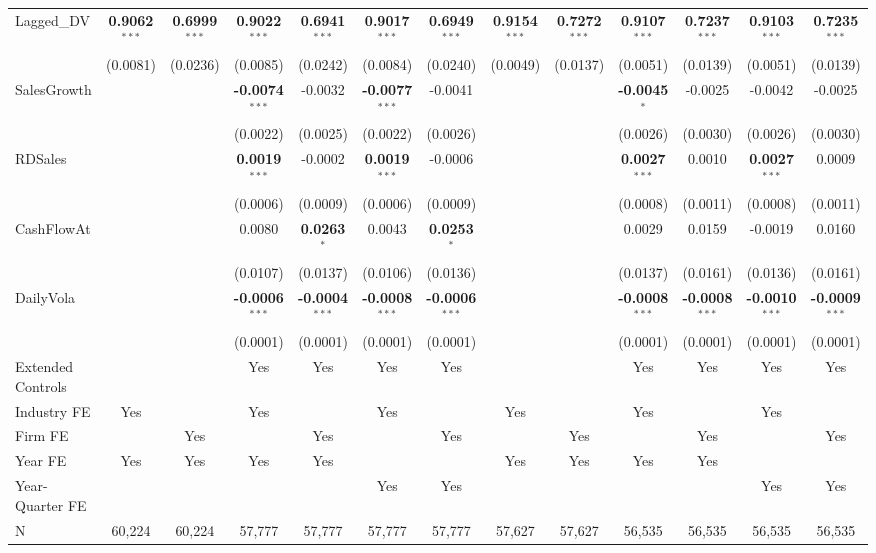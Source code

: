 \begin{landscape}
\begin{table}[H]
\begin{tabular}{lcccccccccccc}
Lagged\_DV & \textbf{0.9062}$^{***}$ & \textbf{0.6999}$^{***}$ & \textbf{0.9022}$^{***}$ & \textbf{0.6941}$^{***}$ & \textbf{0.9017}$^{***}$ & \textbf{0.6949}$^{***}$ & \textbf{0.9154}$^{***}$ & \textbf{0.7272}$^{***}$ & \textbf{0.9107}$^{***}$ & \textbf{0.7237}$^{***}$ & \textbf{0.9103}$^{***}$ & \textbf{0.7235}$^{***}$ \\
 & (0.0081) & (0.0236) & (0.0085) & (0.0242) & (0.0084) & (0.0240) & (0.0049) & (0.0137) & (0.0051) & (0.0139) & (0.0051) & (0.0139) \\
SalesGrowth &  &  & \textbf{-0.0074}$^{***}$ & -0.0032 & \textbf{-0.0077}$^{***}$ & -0.0041 &  &  & \textbf{-0.0045}$^{*}$ & -0.0025 & -0.0042 & -0.0025 \\
 &  &  & (0.0022) & (0.0025) & (0.0022) & (0.0026) &  &  & (0.0026) & (0.0030) & (0.0026) & (0.0030) \\
RDSales &  &  & \textbf{0.0019}$^{***}$ & -0.0002 & \textbf{0.0019}$^{***}$ & -0.0006 &  &  & \textbf{0.0027}$^{***}$ & 0.0010 & \textbf{0.0027}$^{***}$ & 0.0009 \\
 &  &  & (0.0006) & (0.0009) & (0.0006) & (0.0009) &  &  & (0.0008) & (0.0011) & (0.0008) & (0.0011) \\
CashFlowAt &  &  & 0.0080 & \textbf{0.0263}$^{*}$ & 0.0043 & \textbf{0.0253}$^{*}$ &  &  & 0.0029 & 0.0159 & -0.0019 & 0.0160 \\
 &  &  & (0.0107) & (0.0137) & (0.0106) & (0.0136) &  &  & (0.0137) & (0.0161) & (0.0136) & (0.0161) \\
DailyVola &  &  & \textbf{-0.0006}$^{***}$ & \textbf{-0.0004}$^{***}$ & \textbf{-0.0008}$^{***}$ & \textbf{-0.0006}$^{***}$ &  &  & \textbf{-0.0008}$^{***}$ & \textbf{-0.0008}$^{***}$ & \textbf{-0.0010}$^{***}$ & \textbf{-0.0009}$^{***}$ \\
 &  &  & (0.0001) & (0.0001) & (0.0001) & (0.0001) &  &  & (0.0001) & (0.0001) & (0.0001) & (0.0001) \\
\midrule
Extended Controls &  &  & Yes & Yes & Yes & Yes &  &  & Yes & Yes & Yes & Yes \\
Industry FE & Yes &  & Yes &  & Yes &  & Yes &  & Yes &  & Yes &  \\
Firm FE &  & Yes &  & Yes &  & Yes &  & Yes &  & Yes &  & Yes \\
Year FE & Yes & Yes & Yes & Yes &  &  & Yes & Yes & Yes & Yes &  &  \\
Year-Quarter FE &  &  &  &  & Yes & Yes &  &  &  &  & Yes & Yes \\
\midrule
N & 60,224 & 60,224 & 57,777 & 57,777 & 57,777 & 57,777 & 57,627 & 57,627 & 56,535 & 56,535 & 56,535 & 56,535 \\

\end{tabular}
\end{table}
\end{landscape}
